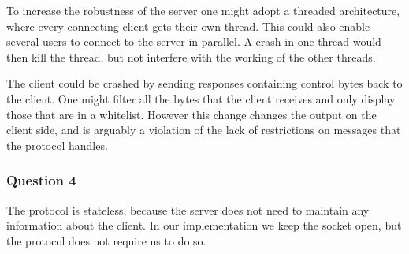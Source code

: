 To increase the robustness of the server one might adopt a threaded architecture, where every connecting client gets their own thread.
This could also enable several users to connect to the server in parallel. A crash in one thread would then kill the thread, but not
interfere with the working of the other threads.

The client could be crashed by sending responses containing control bytes back to the client. One might filter all the bytes that
the client receives and only display those that are in a whitelist. However this change changes the output on the client side, and
is arguably a violation of the lack of restrictions on messages that the protocol handles.

\subsubsection{Question 4}

The protocol is stateless, because the server does not need to maintain any information about the client. In our implementation we keep the socket open, but the protocol does not require us to do so.
